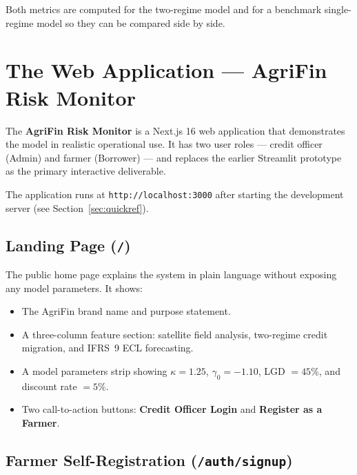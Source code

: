 \documentclass[12pt,a4paper]{article}
\begin{document}
Both metrics are computed for the two-regime model and for a benchmark
single-regime model so they can be compared side by side.

\newpage
\section{The Web Application --- AgriFin Risk Monitor}

The \textbf{AgriFin Risk Monitor} is a Next.js 16 web application that
demonstrates the model in realistic operational use.  It has two user roles
--- credit officer (Admin) and farmer (Borrower) --- and replaces the earlier
Streamlit prototype as the primary interactive deliverable.

The application runs at \texttt{http://localhost:3000} after starting the
development server (see Section~\ref{sec:quickref}).

\subsection{Landing Page (\texttt{/})}

The public home page explains the system in plain language without exposing
any model parameters.  It shows:

\begin{itemize}[leftmargin=1.5em]
  \item The AgriFin brand name and purpose statement.
  \item A three-column feature section: satellite field analysis, two-regime
        credit migration, and IFRS~9 ECL forecasting.
  \item A model parameters strip showing $\kappa = 1.25$, $\gamma_0 = -1.10$,
        LGD $= 45\%$, and discount rate $= 5\%$.
  \item Two call-to-action buttons: \textbf{Credit Officer Login} and
        \textbf{Register as a Farmer}.
\end{itemize}

\subsection{Farmer Self-Registration (\texttt{/auth/signup})}
\end{document}

